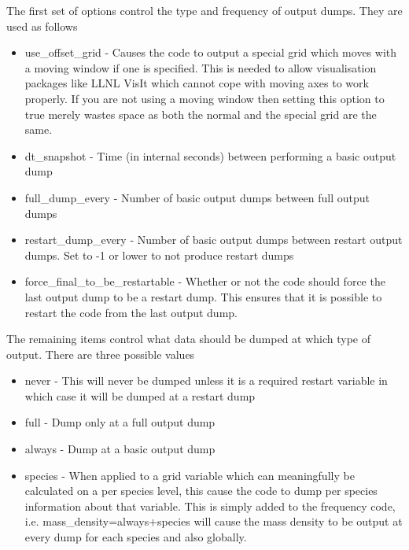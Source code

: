 \documentclass[12pt]{article}
\begin{document}
The first set of options control the type and frequency of output dumps. They
are used as follows\\
\begin{itemize}
\item use\_offset\_grid - Causes the code to output a special grid which moves
  with a moving window if one is specified. This is needed to allow
  visualisation packages like LLNL VisIt which cannot cope with moving axes to
  work properly. If you are not using a moving window then setting this option
  to true merely wastes space as both the normal and the special grid are the
  same.
\item dt\_snapshot - Time (in internal seconds) between performing a basic
  output dump
\item full\_dump\_every - Number of basic output dumps between full output
  dumps
\item restart\_dump\_every - Number of basic output dumps between restart
  output dumps. Set to -1 or lower to not produce restart dumps
\item force\_final\_to\_be\_restartable - Whether or not the code should force
  the last output dump to be a restart dump. This ensures that it is possible
  to restart the code from the last output dump.
\end{itemize}

The remaining items control what data should be dumped at which type of
output. There are three possible values\\
\begin{itemize}
\item never - This will never be dumped unless it is a required restart
  variable in which case it will be dumped at a restart dump
\item full - Dump only at a full output dump
\item always - Dump at a basic output dump
\item species - When applied to a grid variable which can meaningfully be
  calculated on a per species level, this cause the code to dump per species
  information about that variable. This is simply added to the frequency code,
  i.e. mass\_density=always+species will cause the mass density to be output
  at every dump for each species and also globally.
\end{itemize}
\end{document}
